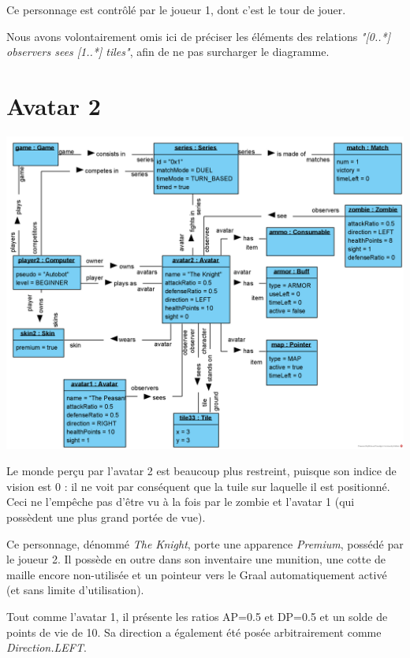 \documentclass[oneside,a4paper]{book}
\begin{document}
Ce personnage est contrôlé par le joueur 1, dont c'est le tour de jouer.

    \begin{tcolorbox}
    Nous avons volontairement omis ici de préciser les éléments des relations \textit{"[0..*] observers sees [1..*] tiles"}, afin de ne pas surcharger le diagramme.
    \end{tcolorbox}

\section{Avatar 2}
\includegraphics[width=\textwidth,height=\textheight,keepaspectratio]{Diagrams/OD-Player2.png}\newline

Le monde perçu par l'avatar 2 est beaucoup plus restreint, puisque son indice de vision est 0 : il ne voit par conséquent que la tuile sur laquelle il est positionné. Ceci ne l'empêche pas d'être vu à la fois par le zombie et l'avatar 1 (qui possèdent une plus grand portée de vue).\newline

Ce personnage, dénommé \textit{The Knight}, porte une apparence \textit{Premium}, possédé par le joueur 2. Il possède en outre dans son inventaire une munition, une cotte de maille encore non-utilisée et un pointeur vers le Graal automatiquement activé (et sans limite d'utilisation).\newline

Tout comme l'avatar 1, il présente les ratios AP=0.5 et DP=0.5 et un solde de points de vie de 10. Sa direction a également été posée arbitrairement comme \textit{Direction.LEFT}.\newline
\end{document}

